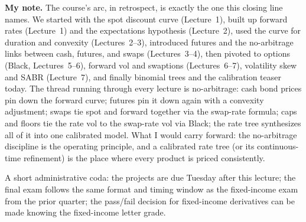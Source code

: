 \begin{checkpoint}
\textbf{My note.} The course's arc, in retrospect, is exactly the
one this closing line names. We started with the spot discount curve
(Lecture~1), built up forward rates (Lecture~1) and the expectations
hypothesis (Lecture~2), used the curve for duration and convexity
(Lectures~2--3), introduced futures and the no-arbitrage links
between cash, futures, and swaps (Lectures~3--4), then pivoted to
options (Black, Lectures~5--6), forward vol and swaptions
(Lectures~6--7), volatility skew and SABR (Lecture~7), and finally
binomial trees and the calibration teaser today. The thread running
through every lecture is no-arbitrage: cash bond prices pin down the
forward curve; futures pin it down again with a convexity adjustment;
swaps tie spot and forward together via the swap-rate formula;
caps and floors tie the rate vol to the swap-rate vol via Black;
the rate tree synthesizes all of it into one calibrated model.
What I would carry forward: the no-arbitrage discipline is the
operating principle, and a calibrated rate tree (or its continuous-
time refinement) is the place where every product is priced
consistently.
\end{checkpoint}

A short administrative coda: the projects are due Tuesday after
this lecture; the final exam follows the same format and timing
window as the fixed-income exam from the prior quarter; the
pass/fail decision for fixed-income derivatives can be made knowing
the fixed-income letter grade.

